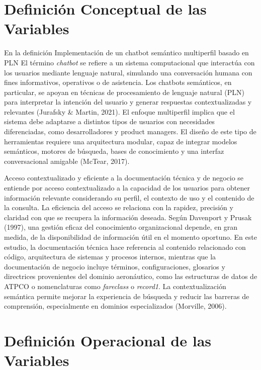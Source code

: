 \section{Definición Conceptual de las Variables}

En la definición Implementación de un chatbot semántico multiperfil basado en PLN El término \textit{chatbot} se refiere a un sistema computacional que interactúa con los usuarios mediante lenguaje natural, simulando una conversación humana con fines informativos, operativos o de asistencia. Los chatbots semánticos, en particular, se apoyan en técnicas de procesamiento de lenguaje natural (PLN) para interpretar la intención del usuario y generar respuestas contextualizadas y relevantes (Jurafsky \& Martin, 2021).
El enfoque multiperfil implica que el sistema debe adaptarse a distintos tipos de usuarios con necesidades diferenciadas, como desarrolladores y product managers. El diseño de este tipo de herramientas requiere una arquitectura modular, capaz de integrar modelos semánticos, motores de búsqueda, bases de conocimiento y una interfaz conversacional amigable (McTear, 2017).


Acceso contextualizado y eficiente a la documentación técnica y de negocio se entiende por acceso contextualizado a la capacidad de los usuarios para obtener información relevante considerando su perfil, el contexto de uso y el contenido de la consulta. La eficiencia del acceso se relaciona con la rapidez, precisión y claridad con que se recupera la información deseada. Según Davenport y Prusak (1997), una gestión eficaz del conocimiento organizacional depende, en gran medida, de la disponibilidad de información útil en el momento oportuno.
En este estudio, la documentación técnica hace referencia al contenido relacionado con código, arquitectura de sistemas y procesos internos, mientras que la documentación de negocio incluye términos, configuraciones, glosarios y directrices provenientes del dominio aeronáutico, como las estructuras de datos de ATPCO o nomenclaturas como \textit{fareclass} o \textit{record1}. La contextualización semántica permite mejorar la experiencia de búsqueda y reducir las barreras de comprensión, especialmente en dominios especializados (Morville, 2006).


\section{Definición Operacional de las Variables}

